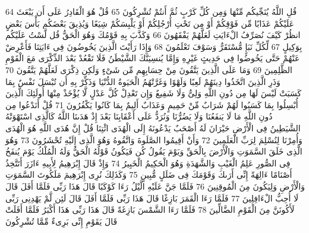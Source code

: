 {\tiny\colorbox{cl_aya}{64}} قُلِ اللَّهُ يُنَجِّيكُم مِّنْهَا وَمِن كُلِّ كَرْبٍ ثُمَّ أَنتُمْ تُشْرِكُونَ
{\tiny\colorbox{cl_aya}{65}} قُلْ هُوَ الْقَادِرُ عَلَى أَن يَبْعَثَ عَلَيْكُمْ عَذَابًا مِّن فَوْقِكُمْ أَوْ مِن تَحْتِ أَرْجُلِكُمْ أَوْ يَلْبِسَكُمْ شِيَعًا وَيُذِيقَ بَعْضَكُم بَأْسَ بَعْضٍ انظُرْ كَيْفَ نُصَرِّفُ الْءَايَتِ لَعَلَّهُمْ يَفْقَهُونَ
{\tiny\colorbox{cl_aya}{66}} وَكَذَّبَ بِهِ قَوْمُكَ وَهُوَ الْحَقُّ قُل لَّسْتُ عَلَيْكُم بِوَكِيلٍ
{\tiny\colorbox{cl_aya}{67}} لِّكُلِّ نَبَإٍ مُّسْتَقَرٌّ وَسَوْفَ تَعْلَمُونَ
{\tiny\colorbox{cl_aya}{68}} وَإِذَا رَأَيْتَ الَّذِينَ يَخُوضُونَ فِى ءَايَتِنَا فَأَعْرِضْ عَنْهُمْ حَتَّى يَخُوضُوا فِى حَدِيثٍ غَيْرِهِ وَإِمَّا يُنسِيَنَّكَ الشَّيْطَنُ فَلَا تَقْعُدْ بَعْدَ الذِّكْرَى مَعَ الْقَوْمِ الظَّلِمِينَ
{\tiny\colorbox{cl_aya}{69}} وَمَا عَلَى الَّذِينَ يَتَّقُونَ مِنْ حِسَابِهِم مِّن شَىْءٍ وَلَكِن ذِكْرَى لَعَلَّهُمْ يَتَّقُونَ
{\tiny\colorbox{cl_aya}{70}} وَذَرِ الَّذِينَ اتَّخَذُوا دِينَهُمْ لَعِبًا وَلَهْوًا وَغَرَّتْهُمُ الْحَيَوةُ الدُّنْيَا وَذَكِّرْ بِهِ أَن تُبْسَلَ نَفْسٌ بِمَا كَسَبَتْ لَيْسَ لَهَا مِن دُونِ اللَّهِ وَلِىٌّ وَلَا شَفِيعٌ وَإِن تَعْدِلْ كُلَّ عَدْلٍ لَّا يُؤْخَذْ مِنْهَا أُولَئِكَ الَّذِينَ أُبْسِلُوا بِمَا كَسَبُوا لَهُمْ شَرَابٌ مِّنْ حَمِيمٍ وَعَذَابٌ أَلِيمٌ بِمَا كَانُوا يَكْفُرُونَ
{\tiny\colorbox{cl_aya}{71}} قُلْ أَنَدْعُوا مِن دُونِ اللَّهِ مَا لَا يَنفَعُنَا وَلَا يَضُرُّنَا وَنُرَدُّ عَلَى أَعْقَابِنَا بَعْدَ إِذْ هَدَىنَا اللَّهُ كَالَّذِى اسْتَهْوَتْهُ الشَّيَطِينُ فِى الْأَرْضِ حَيْرَانَ لَهُ أَصْحَبٌ يَدْعُونَهُ إِلَى الْهُدَى ائْتِنَا قُلْ إِنَّ هُدَى اللَّهِ هُوَ الْهُدَى وَأُمِرْنَا لِنُسْلِمَ لِرَبِّ الْعَلَمِينَ
{\tiny\colorbox{cl_aya}{72}} وَأَنْ أَقِيمُوا الصَّلَوةَ وَاتَّقُوهُ وَهُوَ الَّذِى إِلَيْهِ تُحْشَرُونَ
{\tiny\colorbox{cl_aya}{73}} وَهُوَ الَّذِى خَلَقَ السَّمَوَتِ وَالْأَرْضَ بِالْحَقِّ وَيَوْمَ يَقُولُ كُن فَيَكُونُ قَوْلُهُ الْحَقُّ وَلَهُ الْمُلْكُ يَوْمَ يُنفَخُ فِى الصُّورِ عَلِمُ الْغَيْبِ وَالشَّهَدَةِ وَهُوَ الْحَكِيمُ الْخَبِيرُ
{\tiny\colorbox{cl_aya}{74}} وَإِذْ قَالَ إِبْرَهِيمُ لِأَبِيهِ ءَازَرَ أَتَتَّخِذُ أَصْنَامًا ءَالِهَةً إِنِّى أَرَىكَ وَقَوْمَكَ فِى ضَلَلٍ مُّبِينٍ
{\tiny\colorbox{cl_aya}{75}} وَكَذَلِكَ نُرِى إِبْرَهِيمَ مَلَكُوتَ السَّمَوَتِ وَالْأَرْضِ وَلِيَكُونَ مِنَ الْمُوقِنِينَ
{\tiny\colorbox{cl_aya}{76}} فَلَمَّا جَنَّ عَلَيْهِ الَّيْلُ رَءَا كَوْكَبًا قَالَ هَذَا رَبِّى فَلَمَّا أَفَلَ قَالَ لَا أُحِبُّ الْءَافِلِينَ
{\tiny\colorbox{cl_aya}{77}} فَلَمَّا رَءَا الْقَمَرَ بَازِغًا قَالَ هَذَا رَبِّى فَلَمَّا أَفَلَ قَالَ لَئِن لَّمْ يَهْدِنِى رَبِّى لَأَكُونَنَّ مِنَ الْقَوْمِ الضَّالِّينَ
{\tiny\colorbox{cl_aya}{78}} فَلَمَّا رَءَا الشَّمْسَ بَازِغَةً قَالَ هَذَا رَبِّى هَذَا أَكْبَرُ فَلَمَّا أَفَلَتْ قَالَ يَقَوْمِ إِنِّى بَرِىءٌ مِّمَّا تُشْرِكُونَ
